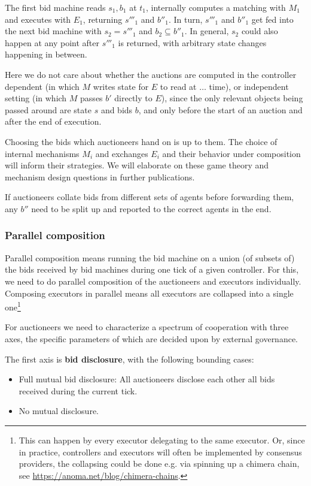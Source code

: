 The first bid machine reads $s_1, b_1$ at $t_1$, internally computes a matching with $M_1$ and executes with $E_1$, returning $s'''_1$ and $b''_1$. In turn, $s'''_1$ and $b''_1$ get fed into the next bid machine with $s_2 = s'''_1$ and $b_2 \subseteq b''_1$. In general, $s_2$ could also happen at any point after $s'''_1$ is returned, with arbitrary state changes happening in between.

Here we do not care about whether the auctions are computed in the controller dependent (in which $M$ writes state for $E$ to read at $\dots$ time), or independent setting (in which $M$ passes $b'$ directly to $E$), since the only relevant objects being passed around are state $s$ and bids $b$, and only before the start of an auction and after the end of execution. 

Choosing the bids which auctioneers hand on is up to them. The choice of internal mechanisms $M_i$ and exchanges $E_i$ and their behavior under composition will inform their strategies. We will elaborate on these game theory and mechanism design questions in further publications.

If auctioneers collate bids from different sets of agents before forwarding them, any $b''$ need to be split up and reported to the correct agents in the end.


\subsubsection{Parallel composition}
Parallel composition means running the bid machine on a union (of subsets of) the bids received by bid machines during one tick of a given controller. For this, we need to do parallel composition of the auctioneers and executors individually. Composing executors in parallel means all executors are collapsed into a single one\footnote{This can happen by every executor delegating to the same executor. Or, since in practice, controllers and executors will often be implemented by consensus providers, the collapsing could be done e.g. via spinning up a chimera chain, see \url{https://anoma.net/blog/chimera-chains}.}

For auctioneers we need to characterize a spectrum of cooperation with three axes, the specific parameters of which are decided upon by external governance.

The first axis is \textbf{bid disclosure}, with the following bounding cases:
\begin{itemize}
    \item Full mutual bid disclosure: All auctioneers disclose each other all bids received during the current tick.
    \item No mutual disclosure.
\end{itemize}

